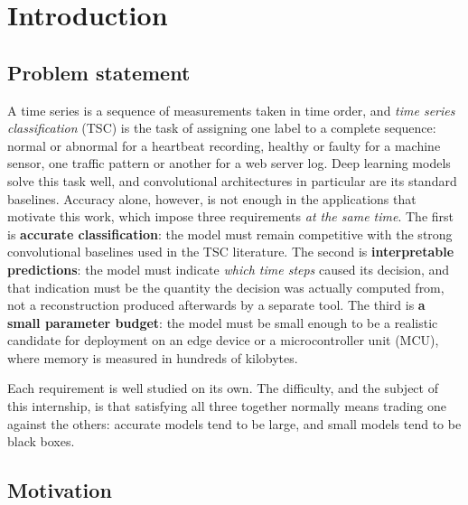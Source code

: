 %

\section{Introduction}
\label{sec:introduction}

\subsection{Problem statement}
\label{sec:intro:problem}

A time series is a sequence of measurements taken in time order, and \emph{time series
classification} (TSC) is the task of assigning one label to a complete sequence: normal or abnormal
for a heartbeat recording, healthy or faulty for a machine sensor, one traffic pattern or another
for a web server log. Deep learning models solve this task well, and convolutional architectures in
particular are its standard baselines. Accuracy alone, however, is not enough in the applications
that motivate this work, which impose three requirements \emph{at the same time}. The first is
\textbf{accurate classification}: the model must remain competitive with the strong convolutional
baselines used in the TSC literature. The second is \textbf{interpretable predictions}: the model
must indicate \emph{which time steps} caused its decision, and that indication must be the quantity
the decision was actually computed from, not a reconstruction produced afterwards by a separate
tool. The third is \textbf{a small parameter budget}: the model must be small enough to be a
realistic candidate for deployment on an edge device or a microcontroller unit (MCU), where memory
is measured in hundreds of kilobytes.

Each requirement is well studied on its own. The difficulty, and the subject of this internship, is
that satisfying all three together normally means trading one against the others: accurate models
tend to be large, and small models tend to be black boxes.

\subsection{Motivation}
\label{sec:intro:motivation}

